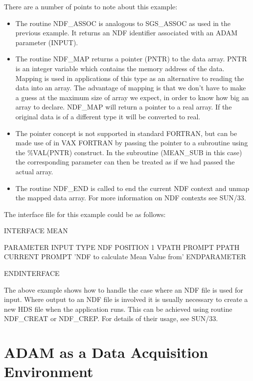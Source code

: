 \documentclass[twoside,11pt,nolof,chapters]{starlink}
\begin{document}
There are a number of points to note about this example:
\begin{itemize}

\item The routine NDF\_ASSOC is analogous to SGS\_ASSOC as used in the previous
example. It returns an NDF identifier associated with an ADAM parameter
(INPUT).

\item The routine NDF\_MAP returns a pointer (PNTR) to the data array.
PNTR is an integer variable which contains the memory address of the data.
Mapping is used in applications of this type as an alternative to reading
the data into an array. The advantage of mapping is that we don't have to
make a guess at the maximum size of array we expect, in order to know how
big an array to declare. NDF\_MAP will return a pointer to a real array.
If the original data is of a different type it will be converted to real.

\item The pointer concept is not supported in standard FORTRAN, but can
be made use of in VAX FORTRAN by passing the pointer to a subroutine using
the \%VAL(PNTR) construct. In the subroutine (MEAN\_SUB in this case) the
corresponding parameter can then be treated as if we had passed the actual
array.

\item The routine NDF\_END is called to end the current NDF context and
unmap the mapped data array. For more information on NDF contexts see SUN/33.

\end{itemize}
The interface file for this example could be as follows:

\begin{terminalv}
INTERFACE MEAN

   PARAMETER INPUT
      TYPE NDF
      POSITION 1
      VPATH PROMPT
      PPATH CURRENT
      PROMPT 'NDF to calculate Mean Value from'
   ENDPARAMETER

ENDINTERFACE
\end{terminalv}

The above example shows how to handle the case where an NDF file is used
for input. Where output to an NDF file is involved it is usually necessary
to create a new HDS file when the application runs. This can be achieved
using routine NDF\_CREAT or NDF\_CREP. For details of their usage, see SUN/33.

\chapter{ADAM as a Data Acquisition Environment}
\end{document}
